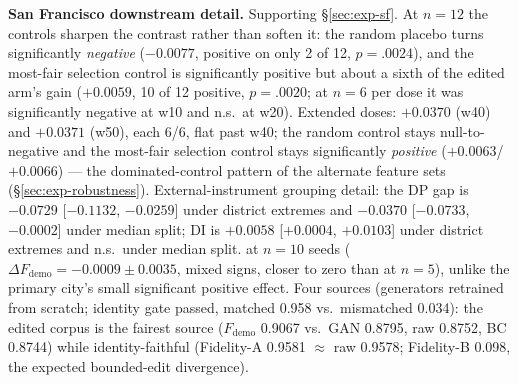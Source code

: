 \textbf{San Francisco downstream detail.} Supporting \S\ref{sec:exp-sf}.
At $n = 12$ the controls sharpen the contrast rather than soften it: the
random placebo turns significantly \emph{negative} ($-0.0077$, positive on
only 2 of 12, $p = .0024$), and the most-fair selection control is
significantly positive but about a sixth of the edited arm's gain
($+0.0059$, 10 of 12 positive, $p = .0020$; at $n = 6$ per dose it was
significantly negative at w10 and n.s.\ at w20).
Extended doses: $+0.0370$ (w40) and $+0.0371$ (w50), each 6/6, flat past
w40; the random control stays null-to-negative and the most-fair selection
control stays significantly \emph{positive} ($+0.0063$/$+0.0066$) --- the
dominated-control pattern of the alternate feature sets
(\S\ref{sec:exp-robustness}).
External-instrument grouping detail: the DP gap is $-0.0729$
[$-0.1132$, $-0.0259$] under district extremes and $-0.0370$ [$-0.0733$,
$-0.0002$] under median split; DI is $+0.0058$ [$+0.0004$, $+0.0103$]
under district extremes and n.s.\ under median split.
at $n = 10$ seeds ($\Delta F_{\mathrm{demo}} = -0.0009 \pm 0.0035$, mixed
signs, closer to zero than at $n = 5$), unlike the primary city's small
significant positive effect. Four sources (generators retrained from
scratch; identity gate passed, matched 0.958 vs.\ mismatched 0.034): the
edited corpus is the fairest source ($F_{\mathrm{demo}}$ 0.9067 vs.\ GAN
0.8795, raw 0.8752, BC 0.8744) while identity-faithful (Fidelity-A 0.9581
$\approx$ raw 0.9578; Fidelity-B 0.098, the expected bounded-edit
divergence).

